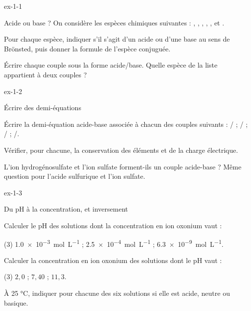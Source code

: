 \begin{blocLivre}{ex-1-1}
\begin{exercice}[1]{Acide ou base ?}
On considère les espèces chimiques suivantes :
, , , , ,  et .
\begin{questions}
\item Pour chaque espèce, indiquer s'il s'agit d'un acide ou d'une base au sens de Brönsted,
puis donner la formule de l'espèce conjuguée.
\item Écrire chaque couple sous la forme acide/base. Quelle espèce de la liste appartient à deux couples ?
\end{questions}
\end{exercice}
\end{blocLivre}
\begin{blocLivre}{ex-1-2}
\begin{exercice}[1]{Écrire des demi-équations}
\begin{questions}
\item Écrire la demi-équation acide-base associée à chacun des couples suivants :
/ ; / ; / ; /.
\item Vérifier, pour chacune, la conservation des éléments et de la charge électrique.
\item L'ion hydrogénosulfate  et l'ion sulfate  forment-ils un couple acide-base ?
Même question pour l'acide sulfurique  et l'ion sulfate.
\end{questions}
\end{exercice}
\end{blocLivre}
\begin{blocLivre}{ex-1-3}
\begin{exercice}[1]{Du pH à la concentration, et inversement}
\begin{questions}
\item Calculer le pH des solutions dont la concentration en ion oxonium vaut :
\begin{tasks}[label=\alph*)](3)
\task \qty{1,0e-3}{mol.L^{-1}} ;
\task \qty{2,5e-4}{mol.L^{-1}} ;
\task \qty{6,3e-9}{mol.L^{-1}}.
\end{tasks}
\item Calculer la concentration en ion oxonium des solutions dont le pH vaut :
\begin{tasks}[label=\alph*)](3)
\task $2{,}0$ ;
\task $7{,}40$ ;
\task $11{,}3$.
\end{tasks}
\item À 25 °C, indiquer pour chacune des six solutions si elle est acide, neutre ou basique.
\end{questions}
\end{exercice}
\end{blocLivre}
